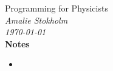 \documentclass[article,oneside,a4paper,11pt]{memoir}
\begin{document}
\noindent
{\center\sffamily
  {\large Programming for Physicists} \\[6pt]
  {\large \itshape Amalie Stokholm} \\
    {\large \itshape \today} \\\vfill
  {\large \bfseries Notes} \par\vfill
}
\begin{itemize}
\item 
\end{itemize}
\end{document}
